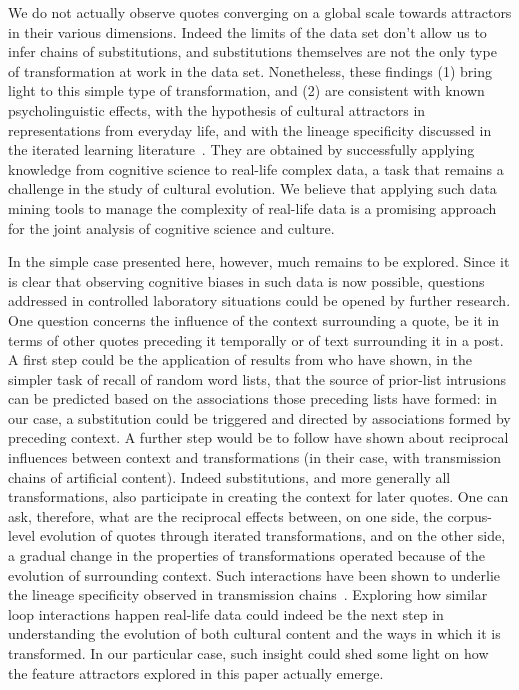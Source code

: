 \begin{new}
We do not actually observe quotes converging on a global scale towards attractors in their various dimensions.
Indeed the limits of the data set don't allow us to infer chains of substitutions, and substitutions themselves are not the only type of transformation at work in the data set.
Nonetheless, these findings (1) bring light to this simple type of transformation, and (2) are consistent with known psycholinguistic effects, with the hypothesis of cultural attractors in representations from everyday life, and with the lineage specificity discussed in the iterated learning literature~\citep{claidiere_cultural_2014,cornish_systems_2013}.
They are obtained by successfully applying knowledge from cognitive science to real-life complex data, a task that remains a challenge in the study of cultural evolution.
We believe that applying such data mining tools to manage the complexity of real-life data is a promising approach for the joint analysis of cognitive science and culture.

In the simple case presented here, however, much remains to be explored.
Since it is clear that observing cognitive biases in such data is now possible, questions addressed in controlled laboratory situations could be opened by further research.
One question concerns the influence of the context surrounding a quote, be it in terms of other quotes preceding it temporally or of text surrounding it in a post.
A first step could be the application of results from \citet{zaromb_temporal_2006} who have shown, in the simpler task of recall of random word lists, that the source of prior-list intrusions can be predicted based on the associations those preceding lists have formed:
in our case, a substitution could be triggered and directed by associations formed by preceding context.
A further step would be to follow \citet{cornish_systems_2013} have shown about reciprocal influences between context and transformations (in their case, with transmission chains of artificial content).
Indeed substitutions, and more generally all transformations, also participate in creating the context for later quotes.
One can ask, therefore, what are the reciprocal effects between, on one side, the corpus-level evolution of quotes through iterated transformations, and on the other side, a gradual change in the properties of transformations operated because of the evolution of surrounding context.
Such interactions have been shown to underlie the lineage specificity observed in transmission chains~\citep{claidiere_cultural_2014}.
Exploring how similar loop interactions happen real-life data could indeed be the next step in understanding the evolution of both cultural content and the ways in which it is transformed.
In our particular case, such insight could shed some light on how the feature attractors explored in this paper actually emerge.

\end{new}

